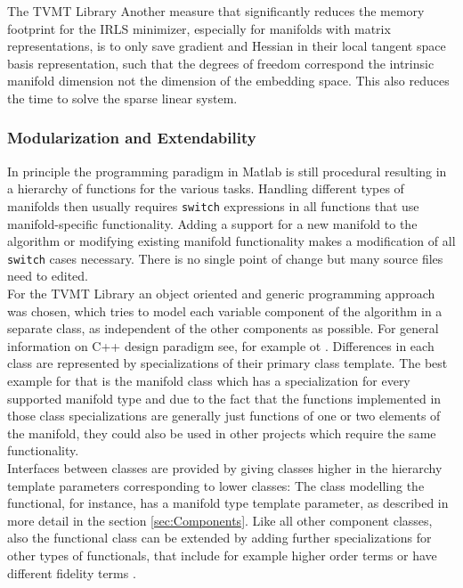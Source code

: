 \begin{chapter}{The TVMT Library}
Another measure that significantly reduces the memory footprint for the IRLS minimizer, especially for manifolds with matrix representations, is to only save gradient and Hessian
in their local tangent space basis representation, such that the degrees of freedom correspond the intrinsic manifold dimension not the dimension of the embedding space. This also reduces
the time to solve the sparse linear system.\\

\subsubsection{Modularization and Extendability} %
\label{ssub:Modularization}
In principle the programming paradigm in Matlab is still procedural resulting in a hierarchy of functions for the various tasks. Handling different types of manifolds
then usually requires \texttt{switch} expressions in all functions that use manifold-specific functionality. Adding a support for a new manifold to the algorithm or modifying
existing manifold functionality makes a modification of all \texttt{switch} cases necessary. There is no single point of change but many source files need to edited.\\

For the TVMT Library an object oriented and generic programming approach was chosen, which tries to model each variable component of the algorithm in a separate class, as 
independent of the other components as possible. For general information on C++ design paradigm see, for example \cite{CPPTemplateMP} ot \cite{CPPGeneric}.
Differences in each class are represented by specializations of their primary class template. The best example for that is the
manifold class which has a specialization for every supported manifold type and due to the fact that the functions implemented in those class specializations are generally
just functions of one or two elements of the manifold, they could also be used in other projects which require the same functionality.\\

Interfaces between classes are provided by giving classes higher in the hierarchy template parameters corresponding to lower classes: The class modelling the functional, for instance,
has a manifold type template parameter, as described in more detail in the section \ref{sec:Components}. Like all other component classes, also the functional class can be extended
by adding further specializations for other types of functionals, that include for example higher order terms or have different fidelity terms \cite{SceneFlow}.\\


\end{chapter}
